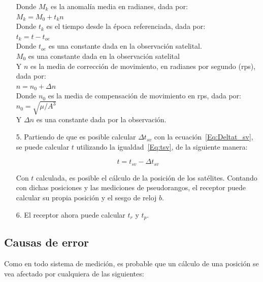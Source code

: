 \begin{itemize}
Donde $M_k$ es la anomalía media en radianes, dada por: \\

$M_k = M_0 + t_k n$\\

Donde $t_k$ es el tiempo desde la época referenciada, dada por:\\

$t_k = t - t_{oe}$\\

Donde $t_{oe}$ es una constante dada en la observación satelital.\\

$M_0$ es una constante dada en la observación satelital\\

Y $n$ es la media de corrección de movimiento, en radianes por segundo (rps), dada por:\\

$n = n_0 + \Delta n$\\

Donde $n_0$ es la media de compensación de movimiento en rps, dada por:\\

$n_0 = \sqrt{\mu / A^{3}}$\\ 

Y $\Delta n$ es una constante dada por la observación.\\

\item[5.] Partiendo de que es posible calcular $\Delta t_{sv}$ con la ecuación~\ref{Eq:Deltat_sv}, se puede calcular $t$ utilizando la igualdad~\ref{Eq:tsv}, de la siguiente manera:

\begin{equation}
\label{t}
t = t_{sv} - \Delta t_{sv}
\end{equation}

Con $t$ calculada, es posible el cálculo de la posición de los satélites. Contando con dichas posiciones y las mediciones de pseudorangos, el receptor puede calcular su propia posición y el sesgo de reloj $b$.

\item[6.] El receptor ahora puede calcular $t_r$ y $t_p$.
\end{itemize}

\subsection{Causas de error}

Como en todo sistema de medición, es probable que un cálculo de una posición se vea afectado por cualquiera de las siguientes: 

